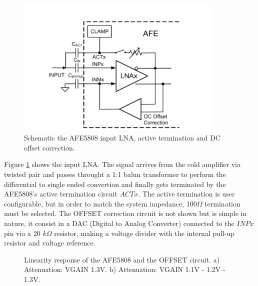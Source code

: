 \begin{figure}[h]
\centering
\includegraphics[width=100mm]{Images/AFE5808_frontend.png}
\caption[]{Schematic the AFE5808 input LNA, active termination and DC offset correction. \cite{afe5808a}}
\label{fig:afe_frontend}
\end{figure}

Figure \ref{fig:afe_frontend} shows the input LNA. The signal arrives from the cold amplifier via twisted pair and passes throught a 1:1 balun transformer to perform the differential to single ended convertion and finally gets terminated by the AFE5808's active termination circuit $ACTx$. The active termination is user configurable, but in order to match the system impedance, 100$\Omega$ termination must be selected. The OFFSET correction circuit is not shown but is simple in nature, it consist in a DAC (Digital to Analog Converter) connected to the $INPx$ pin via a 20 $k\Omega$ resistor, making a voltage divider with the internal pull-up resistor and voltage reference.

\begin{figure}[h]
\centering
{}
\caption[]{Linearity response of the AFE5808 and the OFFSET circuit. a) Attenuation: VGAIN 1.3V. b) Attenuation: VGAIN 1.1V - 1.2V - 1.3V.  }
\label{fig:offset_test}
\end{figure}

